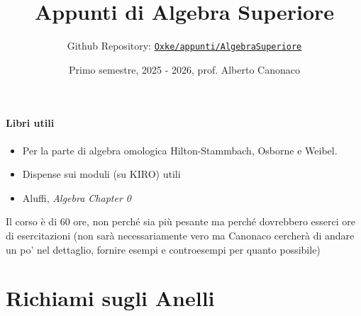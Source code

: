 

\title{Appunti di Algebra Superiore}
\author{Github Repository:
\href{https://github.com/Oxke/appunti/tree/main/AlgebraSuperiore}{\texttt{Oxke/appunti/AlgebraSuperiore}}}

\date{Primo semestre, 2025 \-- 2026, prof. Alberto Canonaco}



\maketitle

\paragraph{Libri utili}
\begin{itemize}[label = --]
    \item Per la parte di algebra omologica Hilton-Stammbach, Osborne e
Weibel.
    \item Dispense sui moduli (su KIRO) utili
    \item Aluffi, \emph{Algebra Chapter 0}
\end{itemize}
Il corso è di 60 ore, non perché sia più pesante ma perché dovrebbero esserci
ore di esercitazioni (non sarà necessariamente vero ma Canonaco cercherà di
andare un po' nel dettaglio, fornire esempi e controesempi per quanto possibile)

\section{Richiami sugli Anelli}







